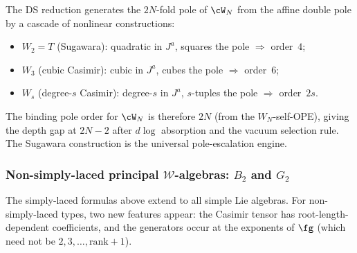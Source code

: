 \begin{remark}
\label{rem:pole-escalation-cascade}
%
The DS reduction generates the $2N$-fold pole of $\cW_N$ from
the affine double pole by a cascade of nonlinear
constructions:
\begin{itemize}
\item $W_2 = T$ (Sugawara): quadratic in $J^a$, squares the
 pole $\Rightarrow$ order~$4$;
\item $W_3$ (cubic Casimir): cubic in $J^a$, cubes the pole
 $\Rightarrow$ order~$6$;
\item $W_s$ (degree-$s$ Casimir): degree-$s$ in $J^a$,
 $s$-tuples the pole $\Rightarrow$ order~$2s$.
\end{itemize}
The binding pole order for $\cW_N$ is therefore
$2N$ (from the $W_N$-self-OPE), giving the depth gap at
$2N - 2$ after $d\log$ absorption and the vacuum selection rule.
The Sugawara construction is the universal pole-escalation engine.
\end{remark}


\subsubsection{Non-simply-laced principal $\mathcal{W}$-algebras:
$B_2$ and $G_2$}
\label{subsubsec:non-simply-laced-ds}

The simply-laced formulas above extend to all simple Lie algebras.
For non-simply-laced types, two new features appear: the Casimir
tensor has root-length-dependent coefficients, and the generators
occur at the exponents of $\fg$ (which need not be $2, 3, \ldots,
\mathrm{rank} + 1$).

